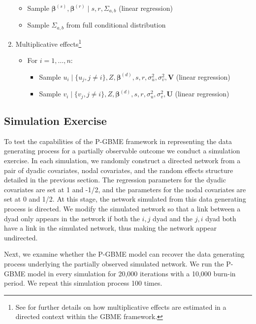 \documentclass[a4paper, 12pt]{article}
\begin{document}
\begin{enumerate}
\begin{itemize}
    \item Sample $\bm{\beta}^{(s)}, \bm{\beta}^{(r)} \;|\; s, r, \Sigma_{a,b}$ (linear regression)
    \item Sample $\Sigma_{a,b}$ from full conditional distribution
  \end{itemize}
  \item Multiplicative effects\footnote{See \citet{hoff:2009} for further details on how multiplicative effects are estimated in a directed context within the GBME framework. }
  \begin{itemize}
    \item For $i = 1, \ldots, n$:
    \begin{itemize}
      \item Sample $u_{i} \;|\; \{u_{j}, j \neq i\}, Z, \bm{\beta}^{(d)}, s, r, \sigma_u^2, \sigma_v^2, \bm{V}$ (linear regression)
      \item Sample $v_{i} \;|\; \{v_{j}, j \neq i\}, Z, \bm{\beta}^{(d)}, s, r, \sigma_u^2, \sigma_v^2, \bm{U}$ (linear regression)
    \end{itemize}
  \end{itemize}
\end{enumerate}

\subsection{Simulation Exercise}

To test the capabilities of the P-GBME framework in representing the data generating process for a partially observable outcome we conduct a simulation exercise. In each simulation, we randomly construct a directed network from a pair of dyadic covariates, nodal covariates, and the random effects structure detailed in the previous section. The regression parameters for the dyadic covariates are set at 1 and -1/2, and the parameters for the nodal covariates are set at 0 and 1/2. At this stage, the network simulated from this data generating process is directed. We modify the simulated network so that a link between a dyad only appears in the network if both the $i,j$ dyad and the $j,i$ dyad both have a link in the simulated network, thus making the network appear undirected. 

Next, we examine whether the P-GBME model can recover the data generating process underlying the partially observed simulated network. We run the P-GBME model in every simulation for 20,000 iterations with a 10,000 burn-in period. We repeat this simulation process 100 times.
\end{document}
